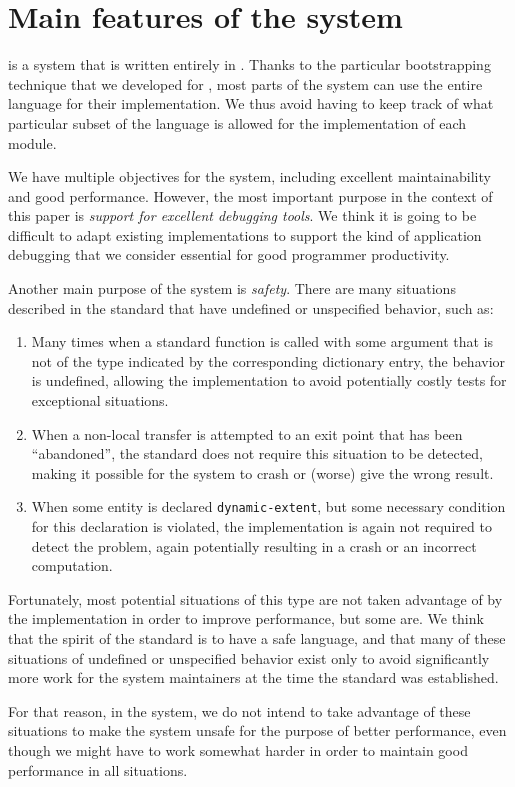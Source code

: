 \section{Main features of the \sicl{} system}
\label{sec-sicl-features}

\sicl{} is a system that is written entirely in \commonlisp{}.  Thanks
to the particular bootstrapping technique
\cite{durand_irene_2019_2634314} that we developed for \sicl{}, most
parts of the system can use the entire language for their
implementation.  We thus avoid having to keep track of what particular
subset of the language is allowed for the implementation of each
module.

We have multiple objectives for the \sicl{} system, including
excellent maintainability and good performance.  However, the most
important purpose in the context of this paper is \emph{support for
  excellent debugging tools}.  We think it is going to be difficult to
adapt existing \commonlisp{} implementations to support the kind of
application debugging that we consider essential for good programmer
productivity.

Another main purpose of the \sicl{} system is \emph{safety}.  There
are many situations described in the \commonlisp{} standard that have
undefined or unspecified behavior, such as:

\begin{enumerate}
\item Many times when a standard function is called with some argument
  that is not of the type indicated by the corresponding dictionary
  entry, the behavior is undefined, allowing the implementation to
  avoid potentially costly tests for exceptional situations.
\item When a non-local transfer is attempted to an exit point that has
  been ``abandoned'', the standard does not require this situation to
  be detected, making it possible for the system to crash or (worse)
  give the wrong result.
\item When some entity is declared \texttt{dynamic-extent}, but some
  necessary condition for this declaration is violated, the
  implementation is again not required to detect the problem, again
  potentially resulting in a crash or an incorrect computation.
\end{enumerate}

Fortunately, most potential situations of this type are not taken
advantage of by the implementation in order to improve performance,
but some are.  We think that the spirit of the \commonlisp{} standard
is to have a safe language, and that many of these situations of
undefined or unspecified behavior exist only to avoid significantly
more work for the system maintainers at the time the standard was
established.

For that reason, in the \sicl{} system, we do not intend to take
advantage of these situations to make the system unsafe for the
purpose of better performance, even though we might have to work
somewhat harder in order to maintain good performance in all
situations.
